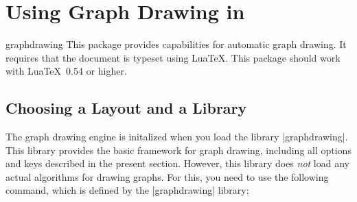 %
%
%


\section{Using Graph Drawing in \tikzname}

{}

\begin{tikzlibrary}{graphdrawing}
  This package provides capabilities for automatic graph drawing. It
  requires that the document is typeset using Lua\TeX. This package
  should work with Lua\TeX\ 0.54 or higher.
\end{tikzlibrary}


\subsection{Choosing a Layout and a Library}

The graph drawing engine is initalized when you load the library
|graphdrawing|. This library provides the basic framework for graph
drawing, including all options and keys described in the present
section. However, this library does \emph{not} load any actual
algorithms for drawing graphs. For this, you need to use the following
command, which is defined by the |graphdrawing| library:

